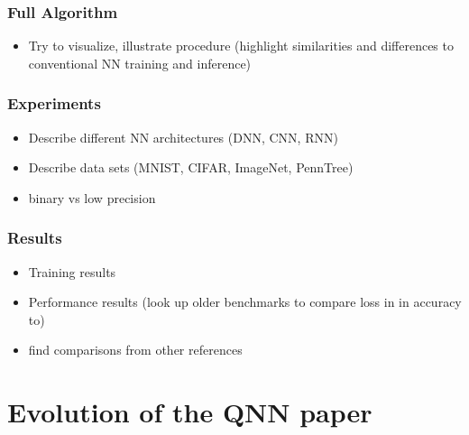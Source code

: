 \documentclass{article}
\begin{document}
\subsubsection*{Full Algorithm}
    \begin{itemize}
        \item Try to visualize, illustrate procedure (highlight similarities and
        differences to conventional NN training and inference)
    \end{itemize}

\subsubsection*{Experiments}
    \begin{itemize}
        \item Describe different NN architectures (DNN, CNN, RNN)
        \item Describe data sets (MNIST, CIFAR, ImageNet, PennTree)
        \item binary vs low precision
    \end{itemize}

\subsubsection*{Results}
    \begin{itemize}
        \item Training results
        \item Performance results (look up older benchmarks to compare loss in
        in accuracy to)
        \item find comparisons from other references
    \end{itemize}

\pagebreak

\section*{Evolution of the QNN paper}
\end{document}
